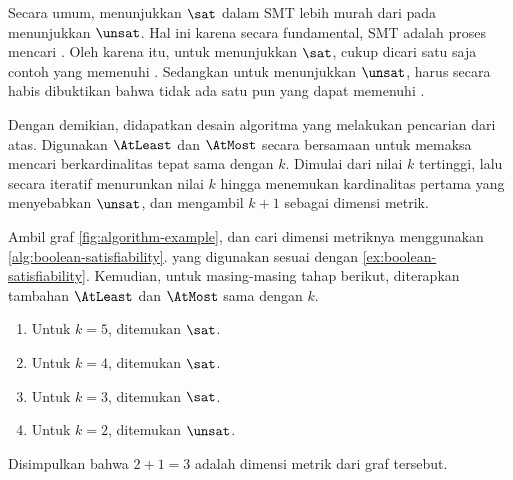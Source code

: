 Secara umum, menunjukkan \(\sat\) dalam SMT lebih murah dari pada menunjukkan \(\unsat\). Hal ini karena secara fundamental, SMT adalah proses mencari . Oleh karena itu, untuk menunjukkan \(\sat\), cukup dicari satu saja contoh yang memenuhi . Sedangkan untuk menunjukkan \(\unsat\), harus secara habis dibuktikan bahwa tidak ada satu pun  yang dapat memenuhi .

Dengan demikian, didapatkan desain algoritma yang melakukan pencarian dari atas. Digunakan \(\AtLeast\) dan \(\AtMost\) secara bersamaan untuk memaksa mencari  berkardinalitas tepat sama dengan \(k\). Dimulai dari nilai \(k\) tertinggi, lalu secara iteratif menurunkan nilai \(k\) hingga menemukan kardinalitas pertama yang menyebabkan \(\unsat\), dan mengambil \(k + 1\) sebagai dimensi metrik.

\begin{example}
	Ambil graf \autoref{fig:algorithm-example}, dan cari dimensi metriknya menggunakan \autoref{alg:boolean-satisfiability}.  yang digunakan sesuai dengan \autoref{ex:boolean-satisfiability}. Kemudian, untuk masing-masing tahap berikut, diterapkan  tambahan \(\AtLeast\) dan \(\AtMost\) sama dengan \(k\).
	\begin{enumerate}
		\item Untuk \(k = 5\), ditemukan \(\sat\).
		\item Untuk \(k = 4\), ditemukan \(\sat\).
		\item Untuk \(k = 3\), ditemukan \(\sat\).
		\item Untuk \(k = 2\), ditemukan \(\unsat\).
	\end{enumerate}
	Disimpulkan bahwa \(2 + 1 = 3\) adalah dimensi metrik dari graf tersebut.
\end{example}


